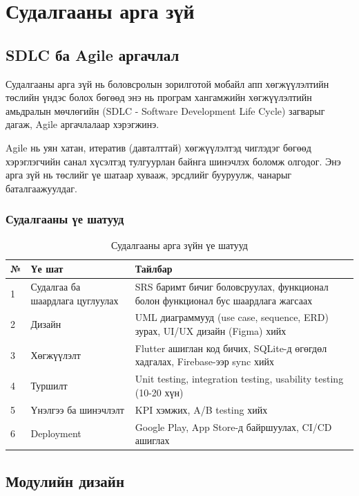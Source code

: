 \newpage
\pagestyle{plain}
\chapter{Судалгааны арга зүй}

\section{SDLC ба Agile аргачлал}

Судалгааны арга зүй нь боловсролын зорилготой мобайл апп хөгжүүлэлтийн төслийн үндэс болох бөгөөд энэ нь програм хангамжийн хөгжүүлэлтийн амьдралын мөчлөгийн (SDLC - Software Development Life Cycle) загварыг дагаж, Agile аргачлалаар хэрэгжинэ.

Agile нь уян хатан, итератив (давталттай) хөгжүүлэлтэд чиглэдэг бөгөөд хэрэглэгчийн санал хүсэлтэд тулгуурлан байнга шинэчлэх боломж олгодог. Энэ арга зүй нь төслийг үе шатаар хувааж, эрсдлийг бууруулж, чанарыг баталгаажуулдаг.

\subsection{Судалгааны үе шатууд}

\begin{table}[htbp]
\centering
\begin{tabular}{|p{0.8cm}|p{4cm}|p{8cm}|}
\hline
\textbf{№} & \textbf{Үе шат} & \textbf{Тайлбар} \\
\hline
1 & Судалгаа ба шаардлага цуглуулах & SRS баримт бичиг боловсруулах, функционал болон функционал бус шаардлага жагсаах \\
\hline
2 & Дизайн & UML диаграммууд (use case, sequence, ERD) зурах, UI/UX дизайн (Figma) хийх \\
\hline
3 & Хөгжүүлэлт & Flutter ашиглан код бичих, SQLite-д өгөгдөл хадгалах, Firebase-ээр sync хийх \\
\hline
4 & Туршилт & Unit testing, integration testing, usability testing (10-20 хүн) \\
\hline
5 & Үнэлгээ ба шинэчлэлт & KPI хэмжих, A/B testing хийх \\
\hline
6 & Deployment & Google Play, App Store-д байршуулах, CI/CD ашиглах \\
\hline
\end{tabular}
\caption{Судалгааны арга зүйн үе шатууд}
\label{tab:sdlc}
\end{table}

\newpage
\section{Модулийн дизайн}

